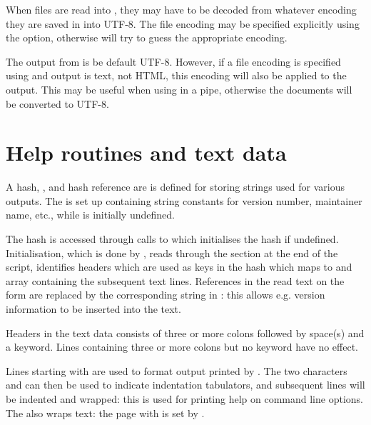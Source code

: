 \documentclass{article}
\begin{document}
When files are read into \TeXcount{}, they may have to be decoded from whatever encoding they are saved in into UTF-8. The file encoding may be specified explicitly using the  option, otherwise \TeXcount{} will try to guess the appropriate encoding.

The output from \TeXcount{} is be default UTF-8. However, if a file encoding is specified using  and output is text, not HTML, this encoding will also be applied to the output. This may be useful when using \TeXcount{} in a pipe, otherwise the documents will be converted to UTF-8.



\section{Help routines and text data}

A hash, , and hash reference  are is defined for storing strings used for various outputs. The  is set up containing string constants for version number, maintainer name, etc., while  is initially undefined.

The  hash is accessed through calls to  which initialises the hash if undefined. Initialisation, which is done by , reads through the  section at the end of the script, identifies headers which are used as keys in the hash which maps to and array containing the subsequent text lines. References in the read text on the form  are replaced by the corresponding string in : this allows e.g. version information to be inserted into the text.

Headers in the text data consists of three or more colons followed by space(s) and a keyword. Lines containing three or more colons but no keyword have no effect.

Lines starting with \code{\@} are used to format output printed by . The two characters  and  can then be used to indicate indentation tabulators, and subsequent lines will be indented and wrapped: this is used for printing help on command line options. The  also wraps text: the page with is set by .
\end{document}

